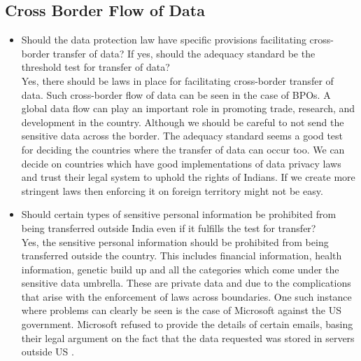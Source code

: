 \subsection{Cross Border Flow of Data}
\begin{itemize}
	\item Should the data protection law have specific provisions facilitating cross-border transfer of data? If yes, should the adequacy standard be the threshold test for transfer of data?
	\\
	Yes, there should be laws in place for facilitating cross-border transfer of data. Such cross-border flow of data can be seen in the case of BPOs. A global data flow can play an important role in promoting trade, research, and development in the country. Although we should be careful to not send the sensitive data across the border. The adequacy standard seems a good test for deciding the countries where the transfer of data can occur too. We can decide on countries which have good implementations of data privacy laws and trust their legal system to uphold the rights of Indians. If we create more stringent laws then enforcing it on foreign territory might not be easy.
	\item Should certain types of sensitive personal information be prohibited from being transferred outside India even if it fulfills the test for transfer?
	\\
	Yes, the sensitive personal information should be prohibited from being transferred outside the country. This includes financial information, health information, genetic build up and all the categories which come under the sensitive data umbrella. These are private data and due to the complications that arise with the enforcement of laws across boundaries. One such instance where problems can clearly be seen is the case of Microsoft against the US government. Microsoft refused to provide the details of certain emails, basing their legal argument on the fact that the data requested was stored in servers outside US \cite{usmicro}.
\end{itemize}
